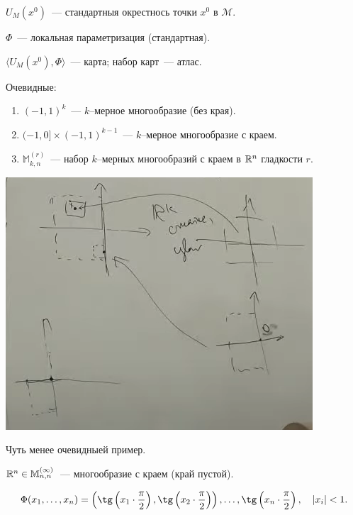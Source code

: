 $U_M (x^0)$~--- стандартныя окрестнось точки $x^0$  в $\mathcal M$.

$\Phi$~--- локальная параметризация (стандартная).

$\langle U_M(x^0), \Phi\rangle $~--- карта; набор карт~--- атлас.

\begin{example}Очевидные:
    \begin{enumerate}
        \item $(-1, 1)^k$~--- $k$--мерное многообразие (без края).
        \item $(-1, 0] \times (-1, 1)^{k-1}$~--- $k$--мерное многообразие с краем.
        \item $\mathbb{M}_{k, n}^{(r)}$~--- набор $k$--мерных многообразий с краем в $\mathbb{R}^n$ гладкости $r$.
    \end{enumerate}
\end{example}

\begin{center}
    \includegraphics[scale=0.5]{img/k-dimensional-variety-ex1.png}
\end{center}

\begin{example} Чуть менее очевидныей пример.

    $\mathbb{R}^n \in \mathbb{M}_{n,n}^{(\infty)}$~--- многообразие с краем (край пустой).

    \[ \Phi(x_1, \dots, x_n) = \left( \tg \left(x_1 \cdot \dfrac{\pi}{2}\right), \tg \left(x_2 \cdot \dfrac{\pi}{2}\right) \right), \dots, \tg \left(x_n \cdot \dfrac{\pi}{2}\right), ~~~ |x_i| < 1.\]
\end{example}

